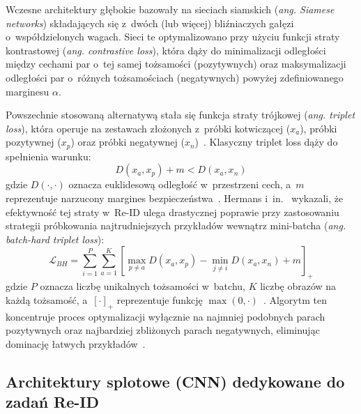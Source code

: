 Wczesne architektury głębokie bazowały na sieciach siamskich (\textit{ang. Siamese networks})
składających się z~dwóch (lub więcej) bliźniaczych gałęzi o~współdzielonych wagach. Sieci te
optymalizowano przy użyciu funkcji straty kontrastowej (\textit{ang. contrastive loss}), która dąży
do minimalizacji odległości między cechami par o~tej samej tożsamości (pozytywnych) oraz
maksymalizacji odległości par o~różnych tożsamościach (negatywnych) powyżej zdefiniowanego
marginesu $\alpha$.

Powszechnie stosowaną alternatywą stała się funkcja straty trójkowej (\textit{ang. triplet loss}),
która operuje na zestawach złożonych z~próbki kotwiczącej ($x_a$), próbki pozytywnej ($x_p$) oraz
próbki negatywnej ($x_n$)~\cite{hermans2017defense}. Klasyczny triplet loss dąży do spełnienia
warunku:
\begin{equation}
  D(x_a, x_p) + m < D(x_a, x_n)
  \label{eq:triplet_loss}
\end{equation}
gdzie $D(\cdot, \cdot)$ oznacza euklidesową odległość w~przestrzeni cech, a~$m$ reprezentuje narzucony margines bezpieczeństwa~\cite{hermans2017defense}. Hermans i~in.~\cite{hermans2017defense} wykazali, że efektywność tej straty w~Re-ID ulega drastycznej poprawie przy zastosowaniu strategii próbkowania najtrudniejszych przykładów wewnątrz mini-batcha (\textit{ang. batch-hard triplet loss}):
\begin{equation}
  \mathcal{L}_{BH} = \sum_{i=1}^{P} \sum_{a=1}^{K}
  \left[ \max_{p \neq a} D(x_a, x_p) - \min_{j \neq i} D(x_a, x_n) + m \right]_+
  \label{eq:batch_hard_triplet}
\end{equation}
gdzie $P$ oznacza liczbę unikalnych tożsamości w~batchu, $K$ liczbę obrazów na każdą tożsamość, a~$[\cdot]_+$ reprezentuje funkcję $\max(0, \cdot)$~\cite{hermans2017defense}. Algorytm ten koncentruje proces optymalizacji wyłącznie na najmniej podobnych parach pozytywnych oraz najbardziej zbliżonych parach negatywnych, eliminując dominację łatwych przykładów~\cite{hermans2017defense}.

\subsection{Architektury splotowe (CNN) dedykowane do zadań Re-ID}
\label{subsec:cnn_reid}

